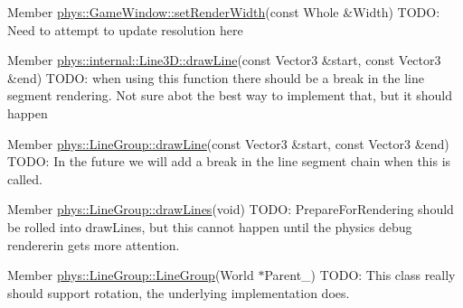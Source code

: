 \begin{DoxyDescription}
\item[Member \hyperlink{classphys_1_1GameWindow_a4a6087112f5a958d153fc74bc03897ba}{phys::GameWindow::setRenderWidth}(const Whole \&Width) ]TODO: Need to attempt to update resolution here 
\end{DoxyDescription}

\label{todo__todo000013}
\hypertarget{todo__todo000013}{}
 
\begin{DoxyDescription}
\item[Member \hyperlink{classphys_1_1internal_1_1Line3D_a31bf19dc06547cbe042e1ddfbcf672f3}{phys::internal::Line3D::drawLine}(const Vector3 \&start, const Vector3 \&end) ]TODO: when using this function there should be a break in the line segment rendering. Not sure abot the best way to implement that, but it should happen 
\end{DoxyDescription}

\label{todo__todo000015}
\hypertarget{todo__todo000015}{}
 
\begin{DoxyDescription}
\item[Member \hyperlink{classphys_1_1LineGroup_a141db62ea17d94b9bce421e5df5a8d89}{phys::LineGroup::drawLine}(const Vector3 \&start, const Vector3 \&end) ]TODO: In the future we will add a break in the line segment chain when this is called. 
\end{DoxyDescription}

\label{todo__todo000016}
\hypertarget{todo__todo000016}{}
 
\begin{DoxyDescription}
\item[Member \hyperlink{classphys_1_1LineGroup_ade1bb4f8e1164e1b8d7aeabbc970b79d}{phys::LineGroup::drawLines}(void) ]TODO: PrepareForRendering should be rolled into drawLines, but this cannot happen until the physics debug rendererin gets more attention. 
\end{DoxyDescription}

\label{todo__todo000014}
\hypertarget{todo__todo000014}{}
 
\begin{DoxyDescription}
\item[Member \hyperlink{classphys_1_1LineGroup_a676039a6beec56d24c631e9da5fd7e76}{phys::LineGroup::LineGroup}(World $\ast$Parent\_\-) ]TODO: This class really should support rotation, the underlying implementation does. 
\end{DoxyDescription}

